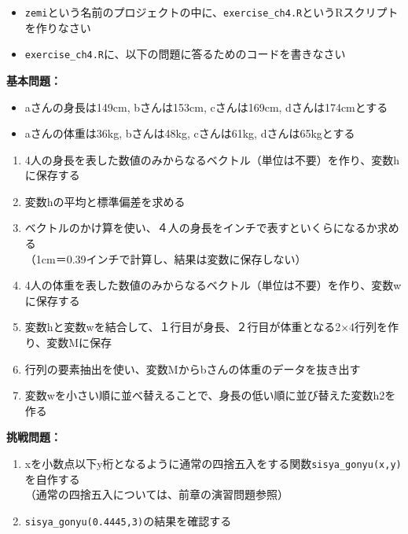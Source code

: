 \documentclass[
]{book}
\providecommand{\tightlist}{%
  \setlength{\itemsep}{0pt}\setlength{\parskip}{0pt}}
\begin{document}
\begin{itemize}
\tightlist
\item
  \texttt{zemi}という名前のプロジェクトの中に、\texttt{exercise\_ch4.R}というRスクリプトを作りなさい
\item
  \texttt{exercise\_ch4.R}に、以下の問題に答るためのコードを書きなさい
\end{itemize}

\textbf{基本問題：}

\begin{itemize}
\tightlist
\item
  aさんの身長は149cm, bさんは153cm, cさんは169cm, dさんは174cmとする
\item
  aさんの体重は36kg, bさんは48kg, cさんは61kg, dさんは65kgとする\\
\end{itemize}

\begin{enumerate}
\def\labelenumi{\arabic{enumi}.}
\tightlist
\item
  4人の身長を表した数値のみからなるベクトル（単位は不要）を作り、変数hに保存する
\item
  変数hの平均と標準偏差を求める\\
\item
  ベクトルのかけ算を使い、４人の身長をインチで表すといくらになるか求める\\
  （1cm＝0.39インチで計算し、結果は変数に保存しない）\\
\item
  4人の体重を表した数値のみからなるベクトル（単位は不要）を作り、変数wに保存する
\item
  変数hと変数wを結合して、１行目が身長、２行目が体重となる2×4行列を作り、変数Mに保存\\
\item
  行列の要素抽出を使い、変数Mからbさんの体重のデータを抜き出す
\item
  変数wを小さい順に並べ替えることで、身長の低い順に並び替えた変数h2を作る
\end{enumerate}

\textbf{挑戦問題：}

\begin{enumerate}
\def\labelenumi{\arabic{enumi}.}
\tightlist
\item
  xを小数点以下y桁となるように通常の四捨五入をする関数\texttt{sisya\_gonyu(x,y)}を自作する\\
  （通常の四捨五入については、前章の演習問題参照）
\item
  \texttt{sisya\_gonyu(0.4445,3)}の結果を確認する
\end{enumerate}
\end{document}
